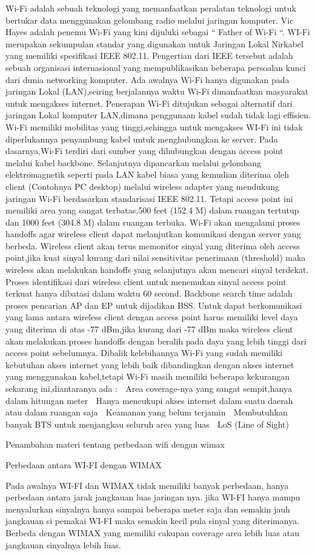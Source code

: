 Wi-Fi adalah sebuah teknologi yang memanfaatkan peralatan teknologi untuk bertukar data menggunakan gelombang radio melalui jaringan komputer. Vic Hayes adalah penemu Wi-Fi yang kini dijuluki sebagai “ Father of Wi-Fi “. WI-Fi merupakan sekumpulan standar yang digunakan untuk Jaringan Lokal Nirkabel yang memiliki spesifikasi IEEE 802.11. Pengertian dari IEEE tersebut adalah sebuah organisasi internasional yang mempublikasikan beberapa persoalan kunci dari dunia networking komputer. Ada awalnya Wi-Fi hanya digunakan pada jaringan Lokal (LAN),seiring berjalannya waktu Wi-Fi dimanfaatkan masyarakat untuk mengakses internet. Penerapan Wi-Fi  ditujukan sebagai alternatif dari jaringan Lokal komputer LAN,dimana penggunaan kabel sudah tidak lagi effisien. Wi-Fi memiliki mobilitas yang tinggi,sehingga untuk mengakses WI-Fi ini tidak diperlukannya penyambung kabel untuk menghubungkan ke server.
Pada dasarnya,Wi-Fi terdiri dari sumber yang dihubungkan dengan access point melalui kabel backbone. Selanjutnya dipancarkan melalui gelombang elektromagnetik seperti pada LAN kabel biasa yang kemudian diterima oleh client (Contohnya PC desktop) melalui wireless adapter yang mendukung jaringan Wi-Fi berdasarkan standarisasi IEEE 802.11. Tetapi access point ini memiliki area yang sangat terbatas,500 feet (152.4 M) dalam ruangan tertutup dan 1000 feet (304.8 M) dalam ruangan terbuka.
Wi-Fi akan mengalami proses handoffs agar wireless client dapat melanjutkan komunikasi dengan server yang berbeda. Wireless client akan terus memonitor sinyal yang diterima oleh access point,jika kuat sinyal kurang dari nilai sensitivitas penerimaan (threshold) maka wireless akan melakukan handoffs yang selanjutnya akan mencari sinyal terdekat. Proses identifikasi dari wireless client untuk menemukan sinyal access point terkuat hanya dibatasi dalam waktu 60 second. Backbone search time adalah proses pencarian AP dan EP untuk dijadikan BSS. Untuk dapat berkomunikasi yang lama antara wireless client dengan access point harus memiliki level daya yang diterima di atas -77 dBm,jika kurang dari -77 dBm maka wireless client akan melakukan proses handoffs dengan beralih pada daya yang lebih tinggi dari access point sebelumnya.
Dibalik kelebihannya Wi-Fi yang sudah memiliki kebutuhan  akses internet yang lebih baik dibandingkan dengan akses internet yang menggunakan kabel,tetapi Wi-Fi masih memiliki beberapa kekurangan sekarang ini,diantaranya ada :
	Area coverage-nya yang sangat sempit,hanya dalam hitungan meter
	Hanya mencukupi akses internet dalam suatu daerah atau dalam ruangan saja
	Keamanan yang belum terjamin
	Membutuhkan banyak BTS untuk menjangkau seluruh area yang luas
	LoS (Line of Sight)



Penambahan materi tentang perbedaan wifi dengan wimax


Perbedaan antara WI-FI dengan WIMAX

Pada awalnya WI-FI dan WIMAX tidak memiliki banyak perbedaan, hanya perbedaan antara jarak jangkauan luas jaringan nya.
jika WI-FI hanya mampu menyalurkan sinyalnya hanya sampai beberapa meter saja dan semakin jauh jangkauan si pemakai WI-FI maka
semakin kecil pula sinyal yang diterimanya. Berbeda dengan WIMAX yang memiliki cakupan coverage area lebih luas atau jangkauan 
sinyalnya lebih luas.


